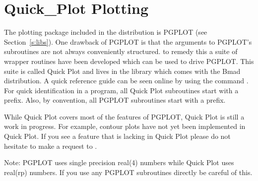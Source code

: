 \chapter{Quick\_Plot Plotting}
\label{c:quick_plot}

The plotting package included in the \bmad distribution is PGPLOT
(see Section~\ref{s:libs}).
One drawback of PGPLOT is that the arguments to
PGPLOT's subroutines are not always conveniently structured. to remedy
this a suite of wrapper routines have been developed which can be
used to drive PGPLOT. This suite is called Quick Plot and lives in the
 library which comes with the Bmad distribution. A quick
reference guide can be seen online by using the command . For quick identification in a program, all Quick Plot
subroutines start with a  prefix. Also, by convention, all
PGPLOT subroutines start with a  prefix.

While Quick Plot covers most of the features of PGPLOT, Quick Plot is
still a work in progress.  For example, contour plots have not yet
been implemented in Quick Plot. If you see a feature that is lacking
in Quick Plot please do not hesitate to make a request to
.

Note: PGPLOT uses single precision real(4) numbers while Quick Plot
uses real(rp) numbers.  If you use any PGPLOT subroutines directly be
careful of this.


